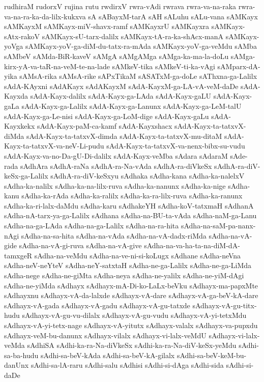 {rudhiraM
rudorxV
rujina
rutu
rwdirxV
rwra-vAdi
rwrava
rwra-va-na-raka
rwra-va-na-ra-ka-da-lilx-kukxva
sA
sABayxM-tarA
sAH
sALuhu
sALu-vana
sAMKayx
sAMKayxM
sAMKayx-miV-shavx-ramf
sAMKayxrU
sAMKayxra
sAMKayx-sAtx-rakoV
sAMKayx-sU-tarx-dalilx
sAMKayx-tA-ra-ka-shAcx-manA
sAMKayx-yoVga
sAMKayx-yoV-ga-diM-du-tatx-ra-mAda
sAMKayx-yoV-ga-veMdu
sAMba
sAMbeV
sAMda-BiR-kaveV
sAMgA
sAMgAMga
sAMga-ka-ma-la-doLu
sAMga-kirx-yA-va-taR-na-veM-te-na-lade
sAMkeV-tika
sAMkeV-ti-ka-vAgi
sAMparx-dA-yika
sAMsA-rika
sAMsA-rike
sAPxTikaM
sASATxM-ga-doLe
sAThxna-ga-Lalilx
sAdA-KAyxni
sAdAKayx
sAdAKayxM
sAdA-KayxM-ga-LA-vA-veM-daDe
sAdA-Kayxda
sAdA-Kayx-dalilx
sAdA-Kayx-ga-LAda
sAdA-Kayx-gaLU
sAdA-Kayx-gaLa
sAdA-Kayx-ga-Lalilx
sAdA-Kayx-ga-Lanunx
sAdA-Kayx-ga-LeM-talU
sAdA-Kayx-ga-Le-nisi
sAdA-Kayx-ga-LoM-dige
sAdA-Kayx-gaLu
sAdA-Kayxkekx
sAdA-Kayx-paM-ca-kamf
sAdA-Kayxshacx
sAdA-Kayx-ta-tatxvX-diMda
sAdA-Kayx-ta-tatxvX-dimda
sAdA-Kayx-ta-tatxvX-mu-ditaM
sAdA-Kayx-ta-tatxvX-va-neV-Li-pudu
sAdA-Kayx-ta-tatxvX-va-nenx-bibx-su-vudu
sAdA-Kayx-va-no-Da-gU-Di-dalilx
sAdA-Kayx-veMba
sAdara
sAdaraM
sAde-rada
sAdhAra
sAdhA-raNa
sAdhA-ra-Na-vAda
sAdhA-ra-diVkeSx
sAdhA-ra-diV-keSx-ga-Lalilx
sAdhA-ra-diV-keSxyu
sAdhaka
sAdha-kana
sAdha-ka-nalelxV
sAdha-ka-nalilx
sAdha-ka-na-lilx-ruva
sAdha-ka-nanunx
sAdha-ka-nige
sAdha-kanu
sAdha-ka-rAda
sAdha-ka-ralilx
sAdha-ka-ra-lilx-ruva
sAdha-ka-ranunx
sAdha-ka-ri-lalx-daMdu
sAdha-karu
sAdhakeYH
sAdha-koV-tatxmaH
sAdhanA
sAdha-nA-tarx-ya-ga-Lalilx
sAdhana
sAdha-na-BU-ta-vAda
sAdha-naM-ga-Lanu
sAdha-na-ga-LAda
sAdha-na-ga-Lalilx
sAdha-na-ra-hita
sAdha-na-saM-pa-nanx-nAgi
sAdha-na-sa-hita
sAdha-na-vAda
sAdha-na-vA-dadx-riMda
sAdha-na-vA-gide
sAdha-na-vA-gi-ruva
sAdha-na-vA-give
sAdha-na-va-ha-ta-na-diM-dA-tamxgeR
sAdha-na-veMdu
sAdha-na-ve-ni-si-koLugx
sAdhane
sAdha-neVna
sAdha-neV-neYteV
sAdha-neY-satxtaH
sAdha-ne-ga-Lalilx
sAdha-ne-ga-LiMda
sAdha-nege
sAdha-ne-giMta
sAdha-neya
sAdha-ne-yalilx
sAdha-ne-yiM-dAgi
sAdha-ne-yiMda
sAdhayx
sAdhayx-mA-Di-ko-LaLx-beVku
sAdhayx-ma-papxMte
sAdhayxnu
sAdhayx-vA-da-lalxde
sAdhayx-vA-dare
sAdhayx-vA-ga-beV-kA-dare
sAdhayx-vA-gada
sAdhayx-vA-gadu
sAdhayx-vA-gu-tatxde
sAdhayx-vA-gu-titx-hudu
sAdhayx-vA-gu-vu-dilalx
sAdhayx-vA-gu-vudu
sAdhayx-vA-yi-tetxMdu
sAdhayx-vA-yi-tetx-nage
sAdhayx-vA-yitutx
sAdhayx-valalx
sAdhayx-va-pupxdu
sAdhayx-veM-bu-danunx
sAdhayx-vilalx
sAdhayx-vi-lalx-veMdU
sAdhayx-vi-lalx-veMda
sAdhiSA
sAdhi-ka-ra-Na-diVkeSx
sAdhi-ka-ra-Na-diV-keSx-yeMdu
sAdhi-sa-ba-hudu
sAdhi-sa-beV-kAda
sAdhi-sa-beV-kA-gilalx
sAdhi-sa-beV-keM-bu-danUnx
sAdhi-sa-lA-raru
sAdhi-salu
sAdhisi
sAdhi-si-dAga
sAdhi-sida
sAdhi-si-daDe
}
